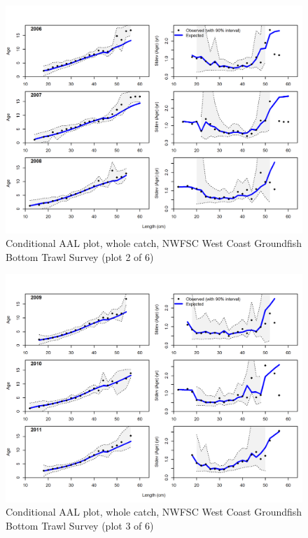 \documentclass[12pt,]{article}
\begin{document}
\begin{figure}
\centering
\includegraphics{r4ss/plots_mod1/comp_condAALfit_Andre_plotsflt7mkt0_page2.png}
\caption{Conditional AAL plot, whole catch, NWFSC West Coast Groundfish
Bottom Trawl Survey (plot 2 of 6) \label{fig:nwfsc_combo_andre_2}}
\end{figure}

\begin{figure}
\centering
\includegraphics{r4ss/plots_mod1/comp_condAALfit_Andre_plotsflt7mkt0_page3.png}
\caption{Conditional AAL plot, whole catch, NWFSC West Coast Groundfish
Bottom Trawl Survey (plot 3 of 6) \label{fig:nwfsc_combo_andre_3}}
\end{figure}
\end{document}
